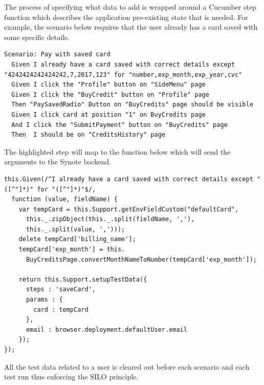 The process of specifying what data to add is wrapped around a Cucumber step function which describes the application pre-existing state that is needed. For example, the scenario below requires that the user already has a card saved with some specific details.

\begin{listing}[H]
\begin{verbatim}
Scenario: Pay with saved card
  Given I already have a card saved with correct details except "4242424242424242,7,2017,123" for "number,exp_month,exp_year,cvc"
  Given I click the "Profile" button on "SideMenu" page
  Given I click the "BuyCredit" button on "Profile" page
  Then "PaySavedRadio" Button on "BuyCredits" page should be visible
  Given I click card at position "1" on BuyCredits page
  And I click the "SubmitPayment" button on "BuyCredits" page
  Then  I should be on "CreditsHistory" page
\end{verbatim}
\label{lst:example-scenario-with-db-setup}
\end{listing}

The highlighted step will map to the function below which will send the arguments to the Synote backend.

\begin{listing}[H]
\begin{verbatim}
this.Given(/^I already have a card saved with correct details except "([^"]*)" for "([^"]*)"$/,
  function (value, fieldName) {
    var tempCard = this.Support.getEnvFieldCustom("defaultCard",
      this._.zipObject(this._.split(fieldName, ','),
      this._.split(value, ',')));
    delete tempCard['billing_name'];
    tempCard['exp_month'] = this.
      BuyCreditsPage.convertMonthNameToNumber(tempCard['exp_month']);

    return this.Support.setupTestData({
      steps : 'saveCard',
      params : {
        card : tempCard
      },
      email : browser.deployment.defaultUser.email
    });
});
\end{verbatim}
\label{lst:data-insertion-step-function}
\end{listing}

All the test data related to a user is cleared out before each scenario and each test run thus enforcing the SILO principle.


